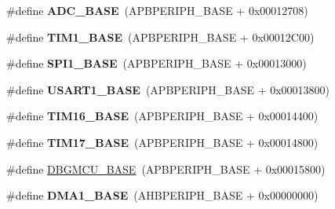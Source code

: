 \begin{DoxyCompactItemize}
\item 
\mbox{\label{group___peripheral__memory__map_gad06cb9e5985bd216a376f26f22303cd6}} 
\#define {\bfseries A\+D\+C\+\_\+\+B\+A\+SE}~(A\+P\+B\+P\+E\+R\+I\+P\+H\+\_\+\+B\+A\+SE + 0x00012708)
\item 
\mbox{\label{group___peripheral__memory__map_gaf8aa324ca5011b8173ab16585ed7324a}} 
\#define {\bfseries T\+I\+M1\+\_\+\+B\+A\+SE}~(A\+P\+B\+P\+E\+R\+I\+P\+H\+\_\+\+B\+A\+SE + 0x00012\+C00)
\item 
\mbox{\label{group___peripheral__memory__map_ga50cd8b47929f18b05efbd0f41253bf8d}} 
\#define {\bfseries S\+P\+I1\+\_\+\+B\+A\+SE}~(A\+P\+B\+P\+E\+R\+I\+P\+H\+\_\+\+B\+A\+SE + 0x00013000)
\item 
\mbox{\label{group___peripheral__memory__map_ga86162ab3f740db9026c1320d46938b4d}} 
\#define {\bfseries U\+S\+A\+R\+T1\+\_\+\+B\+A\+SE}~(A\+P\+B\+P\+E\+R\+I\+P\+H\+\_\+\+B\+A\+SE + 0x00013800)
\item 
\mbox{\label{group___peripheral__memory__map_ga16c97093a531d763b0794c3e6d09e1bf}} 
\#define {\bfseries T\+I\+M16\+\_\+\+B\+A\+SE}~(A\+P\+B\+P\+E\+R\+I\+P\+H\+\_\+\+B\+A\+SE + 0x00014400)
\item 
\mbox{\label{group___peripheral__memory__map_gaffbedbe30e8c4cffdea326d6c1800574}} 
\#define {\bfseries T\+I\+M17\+\_\+\+B\+A\+SE}~(A\+P\+B\+P\+E\+R\+I\+P\+H\+\_\+\+B\+A\+SE + 0x00014800)
\item 
\#define \hyperlink{group___peripheral__memory__map_ga4adaf4fd82ccc3a538f1f27a70cdbbef}{D\+B\+G\+M\+C\+U\+\_\+\+B\+A\+SE}~(A\+P\+B\+P\+E\+R\+I\+P\+H\+\_\+\+B\+A\+SE + 0x00015800)
\item 
\mbox{\label{group___peripheral__memory__map_gab2d8a917a0e4ea99a22ac6ebf279bc72}} 
\#define {\bfseries D\+M\+A1\+\_\+\+B\+A\+SE}~(A\+H\+B\+P\+E\+R\+I\+P\+H\+\_\+\+B\+A\+SE + 0x00000000)
\item 
\mbox{\label{group___peripheral__memory__map_ga888dbc1608243badeb3554ffedc7364c}} 

\end{DoxyCompactItemize}
